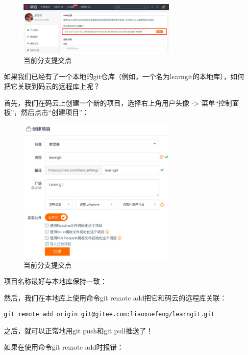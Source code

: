 \begin{figure}[h]
  \centering
  \includegraphics[width=0.7\textwidth]{img/gitee-key.jpg}
  \caption{当前分支提交点}
  \label{fig:gitee-key}
\end{figure}


如果我们已经有了一个本地的git仓库（例如，一个名为learngit的本地库），如何把它关联到码云的远程库上呢？

首先，我们在码云上创建一个新的项目，选择右上角用户头像 -> 菜单“控制面板”，然后点击“创建项目”：


\begin{figure}[h]
  \centering
  \includegraphics[width=0.7\textwidth]{img/gitee-new-repo.jpg}
  \caption{当前分支提交点}
  \label{fig:gitee-new-repo}
\end{figure}

项目名称最好与本地库保持一致：

然后，我们在本地库上使用命令git remote add把它和码云的远程库关联：

\begin{verbatim}
git remote add origin git@gitee.com:liaoxuefeng/learngit.git
\end{verbatim}

之后，就可以正常地用git push和git pull推送了！

如果在使用命令git remote add时报错：

